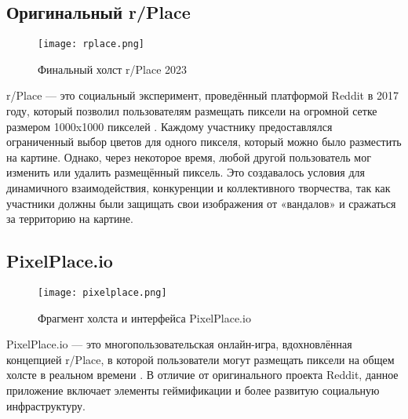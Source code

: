\newpage


\subsection{Оригинальный r/Place}

\begin{figure}[H]
    \texttt{[image: rplace.png]}
    \caption{Финальный холст r/Place 2023}
\end{figure}

r/Place --- это социальный эксперимент, проведённый платформой Reddit в 2017 году, который позволил пользователям размещать пиксели на огромной сетке размером 1000x1000 пикселей \cite{rplace}. Каждому участнику предоставлялся ограниченный выбор цветов для одного пикселя, который можно было разместить на картине. Однако, через некоторое время, любой другой пользователь мог изменить или удалить размещённый пиксель. Это создавалось условия для динамичного взаимодействия, конкуренции и коллективного творчества, так как участники должны были защищать свои изображения от «вандалов» и сражаться за территорию на картине.



\subsection{PixelPlace.io}

\begin{figure}[H]
    \texttt{[image: pixelplace.png]}
    \caption{Фрагмент холста и интерфейса PixelPlace.io}
\end{figure}

PixelPlace.io --- это многопользовательская онлайн-игра, вдохновлённая концепцией r/Place, в которой пользователи могут размещать пиксели на общем холсте в реальном времени \cite{pixelplace}. В отличие от оригинального проекта Reddit, данное приложение включает элементы геймификации и более развитую социальную инфраструктуру.

